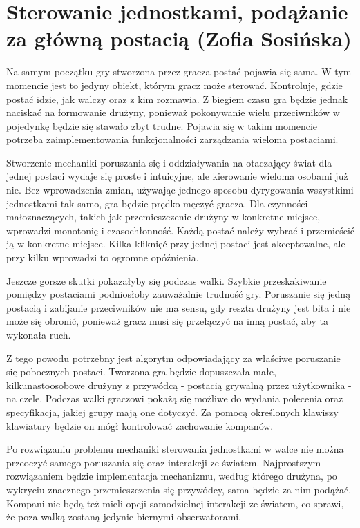 \section{Sterowanie jednostkami, podążanie za główną postacią (Zofia Sosińska)}\label{chap:sjpzgp}
Na samym początku gry stworzona przez gracza postać pojawia się sama. W tym momencie jest to jedyny obiekt, którym gracz może sterować.
Kontroluje, gdzie postać idzie, jak walczy oraz z kim rozmawia. Z biegiem czasu gra będzie jednak naciskać na formowanie drużyny,
ponieważ pokonywanie wielu przeciwników w pojedynkę będzie się stawało zbyt trudne. Pojawia się w takim momencie potrzeba 
zaimplementowania funkcjonalności zarządzania wieloma postaciami.

Stworzenie mechaniki poruszania się i oddziaływania na otaczający świat dla jednej postaci wydaje się proste i intuicyjne, ale kierowanie wieloma osobami już nie. 
Bez wprowadzenia zmian, używając jednego sposobu dyrygowania wszystkimi jednostkami tak samo, gra będzie prędko męczyć gracza.
Dla czynności małoznaczących, takich jak przemieszczenie drużyny w konkretne miejsce, wprowadzi monotonię i czasochłonność.
Każdą postać należy wybrać i przemieścić ją w konkretne miejsce. Kilka kliknięć przy jednej postaci jest akceptowalne, ale przy kilku wprowadzi to ogromne opóźnienia.

Jeszcze gorsze skutki pokazałyby się podczas walki. Szybkie przeskakiwanie pomiędzy postaciami podniosłoby zauważalnie trudność gry.
Poruszanie się jedną postacią i zabijanie przeciwników nie ma sensu, gdy reszta drużyny jest bita i nie może się obronić, ponieważ gracz musi się przełączyć na inną postać,
aby ta wykonała ruch. 

Z tego powodu potrzebny jest algorytm odpowiadający za właściwe poruszanie się pobocznych postaci.
Tworzona gra będzie dopuszczała małe, kilkunastoosobowe drużyny z przywódcą - postacią grywalną przez użytkownika - na czele.
Podczas walki graczowi pokażą się możliwe do wydania polecenia oraz specyfikacja, jakiej grupy mają one dotyczyć.
Za pomocą określonych klawiszy klawiatury będzie on mógł kontrolować zachowanie kompanów.

Po rozwiązaniu problemu mechaniki sterowania jednostkami w walce nie można przeoczyć samego poruszania się oraz interakcji ze światem.
Najprostszym rozwiązaniem będzie implementacja mechanizmu, według którego drużyna, po wykryciu znacznego przemieszczenia się przywódcy, sama będzie za nim podążać.
Kompani nie będą też mieli opcji samodzielnej interakcji ze światem, co sprawi, że poza walką zostaną jedynie biernymi obserwatorami.